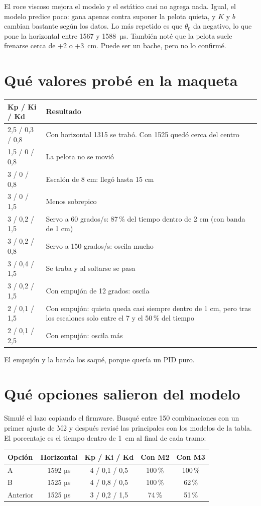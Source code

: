 \documentclass[11pt,a4paper]{article}
\begin{document}
El roce viscoso mejora el modelo y el estático casi no agrega nada. Igual, el modelo predice poco: gana apenas contra suponer la pelota quieta, y $K$ y $b$ cambian bastante según los datos. Lo más repetido es que $\theta_0$ da negativo, lo que pone la horizontal entre 1567 y 1588~µs. También noté que la pelota suele frenarse cerca de +2 o +3~cm. Puede ser un bache, pero no lo confirmé.

\section{Qué valores probé en la maqueta}
\begin{center}\small
\begin{tabular}{lp{9.6cm}}
\hline
Kp / Ki / Kd & Resultado\\ \hline
2,5 / 0,3 / 0,8 & Con horizontal 1315 se trabó. Con 1525 quedó cerca del centro\\
1,5 / 0 / 0,8 & La pelota no se movió\\
3 / 0 / 0,8 & Escalón de 8 cm: llegó hasta 15 cm\\
3 / 0 / 1,5 & Menos sobrepico\\
3 / 0,2 / 1,5 & Servo a 60 grados/s: 87\,\% del tiempo dentro de 2 cm (con banda de 1 cm)\\
3 / 0,2 / 0,8 & Servo a 150 grados/s: oscila mucho\\
3 / 0,4 / 1,5 & Se traba y al soltarse se pasa\\
3 / 0,2 / 1,5 & Con empujón de 12 grados: oscila\\
2 / 0,1 / 1,5 & Con empujón: quieta queda casi siempre dentro de 1 cm, pero tras los escalones solo entre el 7 y el 50\,\% del tiempo\\
2 / 0,1 / 2,5 & Con empujón: oscila más\\ \hline
\end{tabular}
\end{center}
El empujón y la banda los saqué, porque quería un PID puro.

\section{Qué opciones salieron del modelo}
Simulé el lazo copiando el firmware. Busqué entre 150 combinaciones con un primer ajuste de M2 y después revisé las principales con los modelos de la tabla. El porcentaje es el tiempo dentro de 1~cm al final de cada tramo:
\begin{center}\small
\begin{tabular}{lcccc}
\hline
Opción & Horizontal & Kp / Ki / Kd & Con M2 & Con M3\\ \hline
A & 1592 µs & 4 / 0,1 / 0,5 & 100\,\% & 100\,\%\\
B & 1525 µs & 4 / 0,8 / 0,5 & 100\,\% & 62\,\%\\
Anterior & 1525 µs & 3 / 0,2 / 1,5 & 74\,\% & 51\,\%\\ \hline
\end{tabular}
\end{center}
\end{document}
